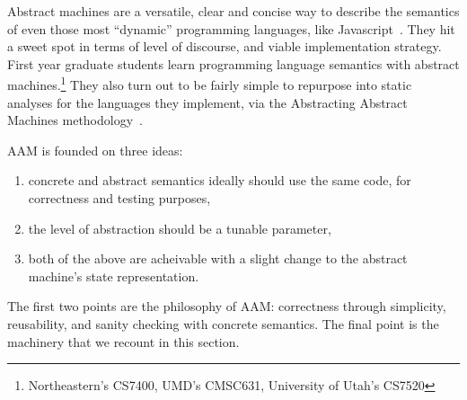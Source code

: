 Abstract machines are a versatile, clear and concise way to describe the semantics of even those most ``dynamic'' programming languages, like Javascript~\citep{ianjohnson:DBLP:journals/corr/KashyapDKWGSWH14}.
%
They hit a sweet spot in terms of level of discourse, and viable implementation strategy.
%
First year graduate students learn programming language semantics with abstract machines.\footnote{Northeastern's CS7400, UMD's CMSC631, University of Utah's CS7520}
%
They also turn out to be fairly simple to repurpose into static analyses for the languages they implement, via the Abstracting Abstract Machines methodology~\citep{dvanhorn:VanHorn2010Abstracting}.

AAM is founded on three ideas:
\begin{enumerate}
\item{concrete and abstract semantics ideally should use the same code, for correctness and testing purposes,}
\item{the level of abstraction should be a tunable parameter,}
\item{both of the above are acheivable with a slight change to the abstract machine's state representation.}
\end{enumerate}

The first two points are the philosophy of AAM: correctness through simplicity, reusability, and sanity checking with concrete semantics.
%
The final point is the machinery that we recount in this section.

